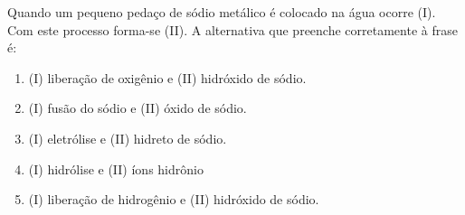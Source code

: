 Quando um pequeno pedaço de sódio metálico é colocado na água ocorre (I). Com este processo forma-se (II). A alternativa que preenche corretamente à frase é: 

\begin{enumerate}[label = (\scalealph{\alph*})]
	\item (I) liberação de oxigênio e (II) hidróxido de sódio.
	\item (I) fusão do sódio e (II) óxido de sódio.
	\item (I) eletrólise e (II) hidreto de sódio. 
	\item (I) hidrólise e (II) íons hidrônio
	\item (I) liberação de hidrogênio e (II) hidróxido de sódio.
\end{enumerate}
